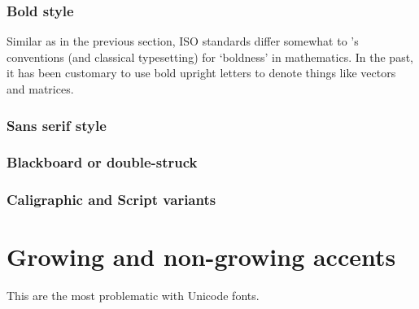 \subsubsection{Bold style}

Similar as in the previous section, ISO standards differ somewhat to \tex’s conventions
(and classical typesetting) for ‘boldness’ in mathematics. In the past, it has
been customary to use bold upright letters to denote things like vectors and matrices.

\subsubsection{Sans serif style}

\subsubsection{Blackboard or double-struck}



\subsubsection{Caligraphic and Script variants}



\section{Growing and non-growing accents}

This are the most problematic with Unicode fonts.



%





